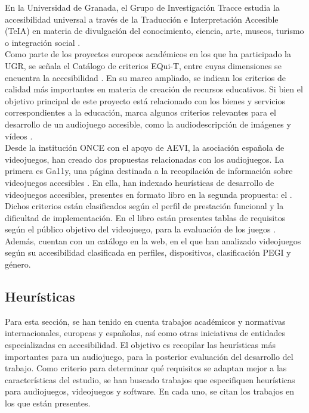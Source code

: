  En la Universidad de Granada, el Grupo de Investigación Tracce estudia la accesibilidad universal a través de la Traducción e Interpretación Accesible (TeIA) en materia de divulgación del conocimiento, ciencia, arte, museos, turismo o integración social \cite{TracceUGR}.\\ %
 
 Como parte de los proyectos europeos académicos en los que ha participado la UGR, se señala el Catálogo de criterios EQui-T, entre cuyas dimensiones se encuentra la accesibilidad \cite{jimenezhurtadoDimensionsSubdimensionsEQUIT2025}. En su marco ampliado, se indican los criterios de calidad más importantes en materia de creación de recursos educativos. Si bien el objetivo principal de este proyecto está relacionado con los bienes y servicios correspondientes a la educación, marca algunos criterios relevantes para el desarrollo de un audiojuego accesible, como la audiodescripción de imágenes y vídeos \cite[p ~77]{jimenezhurtadoDimensionsSubdimensionsEQUIT2025}. \\
 
 Desde la institución ONCE con el apoyo de AEVI, la asociación española de videojuegos, han creado dos propuestas relacionadas con los audiojuegos. La primera es Ga11y, una página destinada a la recopilación de información sobre videojuegos accesibles \cite{Ga11y2022}. En ella, han indexado heurísticas de desarrollo de videojuegos accesibles, presentes en formato libro en la segunda propuesta: el . Dichos criterios están clasificados según el perfil de prestación funcional y la dificultad de implementación. En el libro están presentes tablas de requisitos según el público objetivo del videojuego, para la evaluación de los juegos \cite{LibroBlancoAccesibilidad}. Además, cuentan con un catálogo en la web, en el que han analizado videojuegos según su accesibilidad clasificada en perfiles, dispositivos, clasificación PEGI y género.\\

 

 \subsection{Heurísticas}
 
 Para esta sección, se han tenido en cuenta trabajos académicos y normativas internacionales, europeas y españolas, así como otras iniciativas de entidades especializadas en accesibilidad. El objetivo es recopilar las heurísticas más importantes para un audiojuego, para la posterior evaluación del desarrollo del trabajo. Como criterio para determinar qué requisitos se adaptan mejor a las características del estudio, se han buscado trabajos que especifiquen heurísticas para audiojuegos, videojuegos y software. En cada uno, se citan los trabajos en los que están presentes.\\
 
